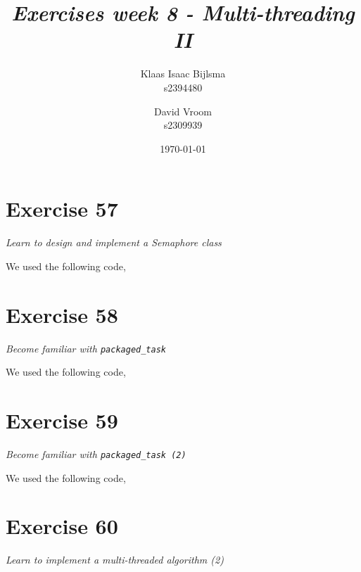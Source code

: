 \documentclass[12pt]{article}
\title{\itshape Exercises week 8 - Multi-threading II}
\author{
	Klaas Isaac Bijlsma \\ s2394480
	\and
	David Vroom \\ s2309939
}
\date{\today}
\newcommand{\desc}[1]{\textit{#1} \vspace{1em}}
\begin{document}
\maketitle

\section*{Exercise 57}
\desc{Learn to design and implement a Semaphore class}

We used the following code,

 
 




\clearpage

\section*{Exercise 58}
\desc{Become familiar with \texttt{packaged\_task}}

We used the following code,



\clearpage

\section*{Exercise 59}
\desc{Become familiar with \texttt{packaged\_task (2)}}

We used the following code,









\clearpage

\section*{Exercise 60}
\desc{Learn to implement a multi-threaded algorithm (2)}
\end{document}
